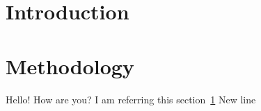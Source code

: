 \documentclass[11pt]{article}
\begin{document}
    \section{Introduction}\label{sec:introduction}

    \section{Methodology}\label{sec:methodology}

    Hello!
    How are you?
    I am referring this section~\ref{sec:introduction}
    New line~\cite{Dirac1953888}


    
    
\end{document}
